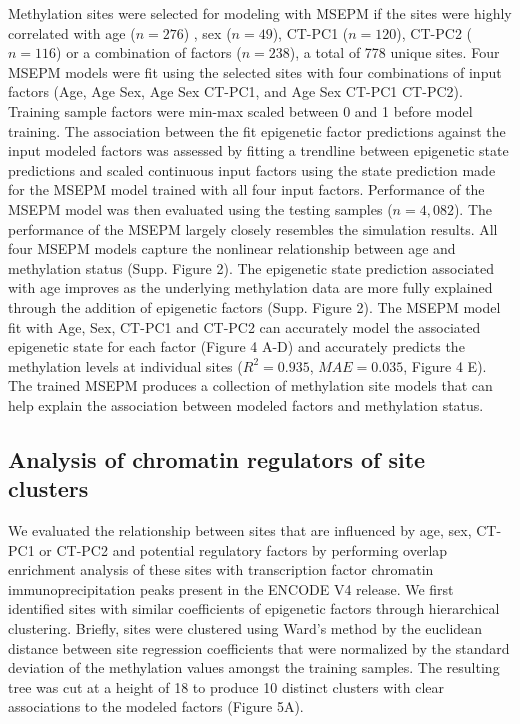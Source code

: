 \documentclass{article}
\begin{document}
{\begin{linenumbers}
Methylation sites were selected for modeling with MSEPM if the sites were highly correlated with 
age ($n=276$) , sex ($n=49$), CT-PC1 ($n=120$), CT-PC2 ($n=116$) or a combination of factors ($n=238$), 
a total of 778 unique sites. Four MSEPM models were fit using the selected sites with four combinations of input 
factors (Age, Age Sex, Age Sex CT-PC1, and Age Sex CT-PC1 CT-PC2). Training sample factors were min-max scaled between 
0 and 1 before model training. The association between the fit epigenetic factor predictions against the input modeled 
factors was assessed by fitting a trendline between epigenetic state predictions and scaled continuous input factors 
using the state prediction made for the MSEPM model trained with all four input factors. Performance of the MSEPM 
model was then evaluated using the testing samples ($n=4,082$). The performance of the MSEPM largely closely 
resembles the simulation results. All four MSEPM models capture the nonlinear relationship between age and 
methylation status (Supp. Figure 2). The epigenetic state prediction associated with age improves as the underlying 
methylation data are more fully explained through the addition of epigenetic factors (Supp. Figure 2). The MSEPM model 
fit with Age, Sex, CT-PC1 and CT-PC2 can accurately model the associated epigenetic state for each factor (Figure 4 A-D) 
and accurately predicts the methylation levels at individual sites ($R^2=0.935$, $MAE=0.035$, Figure 4 E). 
The trained MSEPM produces a collection of methylation site models that can help explain the association between 
modeled factors and methylation status. 

\subsection{Analysis of chromatin regulators of site clusters}

We evaluated the relationship between sites that are influenced by age, sex, CT-PC1 or CT-PC2  and potential 
regulatory factors by performing overlap enrichment analysis of these sites with transcription factor chromatin 
immunoprecipitation peaks present in the ENCODE V4 \cite{ENCODE_Project_Consortium2012-oe,Davis2018-ha} release. We 
first identified sites with similar coefficients of epigenetic factors through hierarchical clustering. Briefly, 
sites were clustered using Ward's method by the euclidean distance between site regression coefficients that were 
normalized by the standard deviation of the methylation values amongst the training samples. The resulting tree was 
cut at a height of 18 to produce 10 distinct clusters with clear associations to the modeled factors (Figure 5A). 


\end{linenumbers}}
\end{document}
